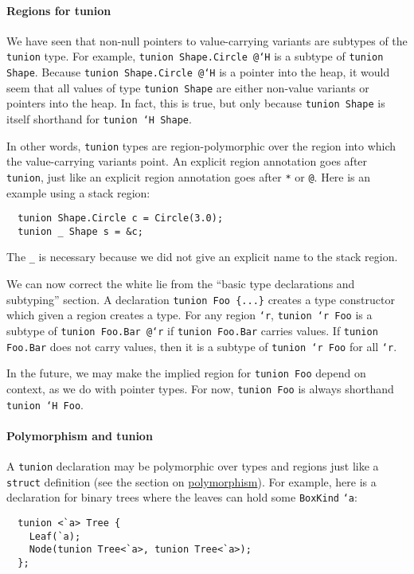\paragraph{Regions for tunion} We have seen that non-null pointers to
value-carrying variants are subtypes of the \texttt{tunion} type.  For
example, \texttt{tunion Shape.Circle @`H} is a subtype of
\texttt{tunion Shape}.  Because \texttt{tunion Shape.Circle @`H} is a
pointer into the heap, it would seem that all values of type
\texttt{tunion Shape} are either non-value variants or pointers into
the heap.  In fact, this is true, but only because \texttt{tunion
Shape} is itself shorthand for
\texttt{tunion `H Shape}.

In other words, \texttt{tunion} types are region-polymorphic over the region
into which the value-carrying variants point.  An explicit region
annotation goes after \texttt{tunion}, just like an explicit region annotation
goes after \texttt{*} or \texttt{@}.  Here is an example using a stack
region:
\begin{verbatim}
  tunion Shape.Circle c = Circle(3.0);
  tunion _ Shape s = &c;
\end{verbatim}

The \texttt{_} is necessary because we did not give an explicit name to
the stack region.

We can now correct the white lie from the ``basic type declarations and
subtyping'' section.  A declaration \verb|tunion Foo {...}| creates a
type constructor which given a region creates a type.  For any region
\texttt{`r}, \texttt{tunion `r Foo} is a subtype of
\texttt{tunion Foo.Bar @`r} if \texttt{tunion Foo.Bar} carries values.  If
\texttt{tunion Foo.Bar} does not carry values, then it is a subtype of
\texttt{tunion `r Foo} for all \texttt{`r}.

In the future, we may make the implied region for \texttt{tunion Foo}
depend on context, as we do with pointer types.  For now,
\texttt{tunion Foo} is always shorthand \texttt{tunion `H Foo}.

\paragraph{Polymorphism and tunion} A \texttt{tunion} declaration may be
polymorphic over types and regions just like a \texttt{struct}
definition (see the section on
\hyperlink{polymorphism}{polymorphism}).  For example, here is a
declaration for binary trees where the leaves can hold some
\texttt{BoxKind} \texttt{`a}:
\begin{verbatim}
  tunion <`a> Tree {
    Leaf(`a);
    Node(tunion Tree<`a>, tunion Tree<`a>);
  };
\end{verbatim}

